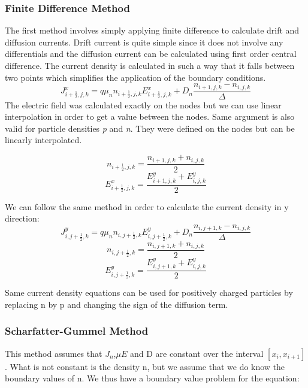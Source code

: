 \subsubsection{Finite Difference Method}
The first method involves simply applying finite difference to calculate drift and diffusion currents. Drift current is quite simple since it does not involve any differentials and the diffusion current can be calculated using first order central difference. The current density is calculated in such a way that it falls between two points which simplifies the application of the boundary conditions.
\begin{equation}
J^x_{i+\frac{1}{2},j,k}=q\mu_n n_{i+\frac{1}{2},j,k} E^x_{i+\frac{1}{2},j,k}+D_n \frac{n_{i+1,j,k}-n_{i,j,k}}{\Delta}
\end{equation}
The electric field was calculated exactly on the nodes but we can use linear interpolation in order to get a value between the nodes. Same argument is also valid for particle densities \textit{p} and \textit{n}. They were defined on the nodes but can be linearly interpolated.

\begin{equation}\nonumber
n_{i+\frac{1}{2},j,k}=\frac{n_{i+1,j,k}+n_{i,j,k}}{2}
\end{equation}
\begin{equation}\nonumber
E^{x}_{i+\frac{1}{2},j,k}=\frac{E^y_{i+1,j,k}+E^y_{i,j,k}}{2}
\end{equation}

We can follow the same method in order to calculate the current density in y direction:
\begin{equation}
J^y_{i,j+\frac{1}{2},k}=q\mu_n n_{i,j+\frac{1}{2},k} E^y_{i,j+\frac{1}{2},k}+D_n \frac{n_{i,j+1,k}-n_{i,j,k}}{\Delta}
\end{equation}
\begin{equation}\nonumber
n_{i,j+\frac{1}{2},k}=\frac{n_{i,j+1,k}+n_{i,j,k}}{2}
\end{equation}
\begin{equation}\nonumber
E^{y}_{i,j+\frac{1}{2},k}=\frac{E^y_{i,j+1,k}+E^y_{i,j,k}}{2}
\end{equation}

Same current density equations can be used for positively charged particles by replacing n by p and changing the sign of the diffusion term.

\subsubsection{Scharfatter-Gummel Method}
This method assumes that $J_n$,$\mu E$ and D are constant over the interval $[x_i,x_{i+1}]$. What is
not constant is the density n, but we assume that we do know the boundary
values of n. We thus have a boundary value problem for the equation:

